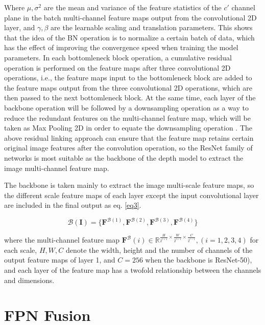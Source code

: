 Where $\mu,\sigma^2$ are the mean and variance of the feature statistics of the $c'$ channel plane in the batch multi-channel feature maps output from the convolutional 2D layer, and $\gamma, \beta$ are the learnable scaling and translation parameters. This shows that the idea of the BN operation is to normalize a certain batch of data, which has the effect of improving the convergence speed when training the model parameters. In each bottomleneck block operation, a cumulative residual operation is performed on the feature maps after three convolutional 2D operations, i.e., the feature maps input to the bottomleneck block are added to the feature maps output from the three convolutional 2D operations, which are then passed to the next bottomleneck block. At the same time, each layer of the backbone operation will be followed by a downsampling operation as a way to reduce the redundant features on the multi-channel feature map, which will be taken as Max Pooling 2D in order to equate the downsampling operation \cite{14}. The above residual linking approach can ensure that the feature map retains certain original image features after the convolution operation, so the ResNet family of networks is most suitable as the backbone of the depth model to extract the image multi-channel feature map.

The backbone is taken mainly to extract the image multi-scale feature maps, so the different scale feature maps of each layer except the input convolutional layer are included in the final output as eq. \ref{eq3}.

\begin{equation}
\label{eq3}
  \mathcal{B}(\mathbf{I}) = \{ \mathbf{F}^{\mathcal{B}(1)}, \mathbf{F}^{\mathcal{B}(2)}, \mathbf{F}^{\mathcal{B}(3)}, \mathbf{F}^{\mathcal{B}(4)} \}
\end{equation}

where the multi-channel feature map $\mathbf{F}^\mathcal{B}(i) \in \mathbb{R}^{\frac{H}{2^{i+1}} \times \frac{W}{2^{i+1}} \times \frac{C}{2^{i-1}}},(i=1,2,3,4)$ for each scale, $H,W,C$ denote the width, height and the number of channels of the output feature maps of layer 1, and $C=256$ when the backbone is ResNet-50), and each layer of the feature map has a twofold relationship between the channels and dimensions.

\section{FPN Fusion}

